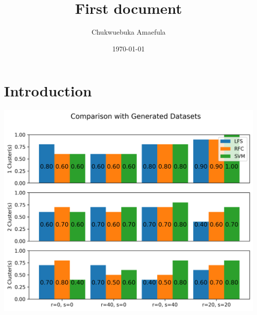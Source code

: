 \documentclass[12pt, letterpaper, twoside]{article}
\title{First document}
\author{Chukwuebuka Amaefula }
\date{\today}
\begin{document}
\maketitle

\section{Introduction}
\includegraphics{GenDataCompare4}
\end{document}
